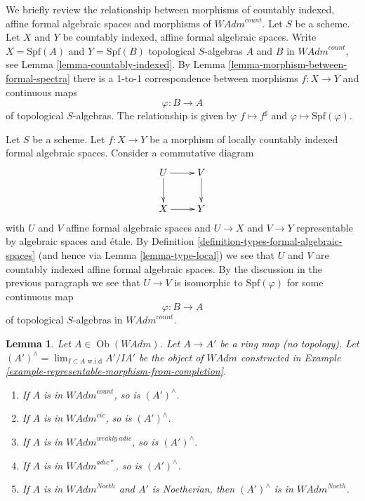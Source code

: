 \documentclass{stacks-project}
\theoremstyle{plain}
\newtheorem{lemma}[subsection]{Lemma}
\theoremstyle{definition}
\theoremstyle{remark}
\numberwithin{equation}{subsection}
\def\lim{\mathop{\mathrm{lim}}\nolimits}
\def\Ob{\mathop{\mathrm{Ob}}\nolimits}
\begin{document}
\medskip\noindent
We briefly review the relationship between morphisms of
countably indexed, affine formal algebraic spaces and
morphisms of $\textit{WAdm}^{count}$.
Let $S$ be a scheme. Let $X$ and $Y$ be countably indexed,
affine formal algebraic spaces. Write $X = \text{Spf}(A)$
and $Y = \text{Spf}(B)$ topological $S$-algebras
$A$ and $B$ in $\textit{WAdm}^{count}$, see
Lemma \ref{lemma-countably-indexed}.
By Lemma \ref{lemma-morphism-between-formal-spectra}
there is a 1-to-1 correspondence between morphisms
$f : X \to Y$ and continuous maps
$$
\varphi : B \longrightarrow A
$$
of topological $S$-algebras. The relationship is given by
$f \mapsto f^\sharp$ and $\varphi \mapsto \text{Spf}(\varphi)$.

\medskip\noindent
Let $S$ be a scheme. Let $f : X \to Y$ be a morphism of
locally countably indexed formal algebraic spaces. Consider a
commutative diagram
$$
\xymatrix{
U \ar[d] \ar[r] & V \ar[d] \\
X \ar[r] & Y
}
$$
with $U$ and $V$ affine formal algebraic spaces and $U \to X$ and $V \to Y$
representable by algebraic spaces and \'etale. By
Definition \ref{definition-types-formal-algebraic-spaces} (and hence via
Lemma \ref{lemma-type-local}) we see that $U$ and $V$ are countably indexed
affine formal algebraic spaces. By the discussion in the previous
paragraph we see that $U \to V$ is isomorphic to $\text{Spf}(\varphi)$
for some continuous map
$$
\varphi : B \longrightarrow A
$$
of topological $S$-algebras in $\textit{WAdm}^{count}$.

\begin{lemma}
\label{lemma-completion-in-sub}
Let $A \in \Ob(\textit{WAdm})$. Let $A \to A'$ be a ring
map (no topology). Let $(A')^\wedge = \lim_{I \subset A\text{ w.i.d}} A'/IA'$
be the object of $\textit{WAdm}$ constructed in
Example \ref{example-representable-morphism-from-completion}.
\begin{enumerate}
\item If $A$ is in $\textit{WAdm}^{count}$, so is $(A')^\wedge$.
\item If $A$ is in $\textit{WAdm}^{cic}$, so is $(A')^\wedge$.
\item If $A$ is in $\textit{WAdm}^{weakly\ adic}$, so is $(A')^\wedge$.
\item If $A$ is in $\textit{WAdm}^{adic*}$, so is $(A')^\wedge$.
\item If $A$ is in $\textit{WAdm}^{Noeth}$ and $A'$ is Noetherian, then
$(A')^\wedge$ is in $\textit{WAdm}^{Noeth}$.
\end{enumerate}
\end{lemma}
\end{document}
